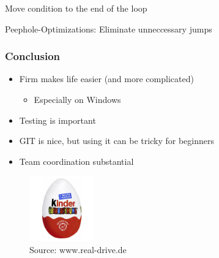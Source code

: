 \documentclass[t]{beamer}
\begin{document}
\begin{frame}
\begin{itemize}
 {\item Move condition to the end of the loop}
 {\item Peephole-Optimizations: Eliminate unneccessary jumps}
\end{itemize}
\end{frame}

\begin{frame}
  \frametitle{Conclusion}


\begin{itemize}
	\item Firm makes life easier (and more complicated)
	\begin{itemize}
		\item Especially on Windows
	\end{itemize}
	\item Testing is important
	\item GIT is nice, but using it can be tricky for beginners
	\item Team coordination substantial
\end{itemize}

 {
\begin{figure}
\includegraphics[width=0.25\textwidth]{images/egg.jpg}
\caption{ Source: www.real-drive.de }
\label{fig:harps_example}
\end{figure}
}
\end{frame}
\end{document}
